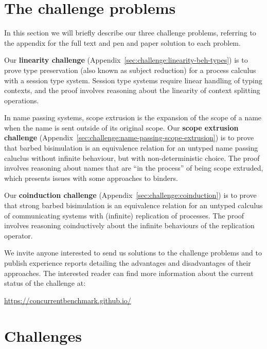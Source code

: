 \documentclass[adraft,copyright,creativecommons]{eptcs}
\begin{document}
\section{The challenge problems}
In this section we will briefly describe our three challenge problems, referring to the appendix for the full text and pen and paper solution to each problem.

Our \textbf{linearity challenge} (Appendix~\ref{sec:challenge:linearity-beh-types}) is to prove type preservation (also known as subject reduction) for a process calculus with a session type system.
Session type systems require linear handling of typing contexts, and the proof involves reasoning about the linearity of context splitting operations.

In name passing systems, scope extrusion is the expansion of the scope of a name when the name is sent outside of its original scope.
Our \textbf{scope extrusion challenge} (Appendix~\ref{sec:challenge:name-passing-scope-extrusion}) is to prove that barbed bisimulation is an equivalence relation for an untyped name passing caluclus without infinite behaviour, but with non-deterministic choice.
The proof involves reasoning about names that are ``in the process'' of being scope extruded, which presents issues with some approaches to binders.

Our \textbf{coinduction challenge} (Appendix~\ref{sec:challenge:coinduction}) is to prove that strong barbed bisimulation is an equivalence relation for an untyped calculus of communicating systems with (infinite) replication of processes.
The proof involves reasoning coinductively about the infinite behaviours of the replication operator.

We invite anyone interested to send us solutions to the challenge problems and to publish experience reports detailing the advantages and disadvantages of their approaches.
The interested reader can find more information about the current status of the challenge at:
\begin{center}
  \url{https://concurrentbenchmark.github.io/}
\end{center}


% 


\appendix

\section{Challenges}

\end{document}
